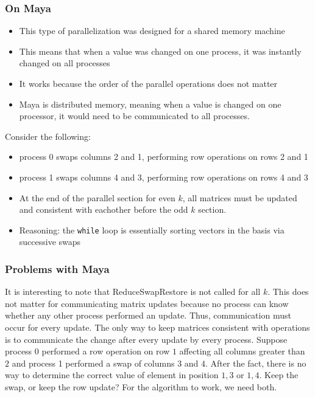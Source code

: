 \documentclass{beamer}
\begin{document}
\begin{frame}
\frametitle{On Maya}
\begin{itemize}
\item This type of parallelization was designed for a shared memory machine
\item This means that when a value was changed on one process, it was instantly changed on all processes
\item It works because the order of the parallel operations does not matter
\item Maya is distributed memory, meaning when a value is changed on one processor, it would need to be communicated to all processes.
\end{itemize}
\end{frame}
\begin{frame}
Consider the following:
\begin{itemize}
\item process 0 swaps columns 2 and 1, performing row operations on rows 2 and 1
\item process 1 swaps columns 4 and 3, performing row operations on rows 4 and 3
\item At the end of the parallel section for even $k$, all matrices must be updated and consistent with eachother before the odd $k$ section.
\item Reasoning: the \texttt{while} loop is essentially sorting vectors in the basis via successive swaps
\end{itemize}
\end{frame}
\begin{frame}
\frametitle{Problems with Maya}
It is interesting to note that ReduceSwapRestore is not called for all $k$. This does not matter for communicating matrix updates because no process can know whether any other process performed an update.
Thus, communication must occur for every update. The only way to keep matrices consistent with operations is to communicate the change after every update by every process.
Suppose process 0 performed a row operation on row $1$ affecting all columns greater than $2$ and process 1 performed a swap of columns $3$ and $4$. After the fact, there is no way to determine the correct value of element in position $1,3$ or $1,4$. Keep the swap, or keep the row update? For the algorithm to work, we need both.
\end{frame}
\end{document}
